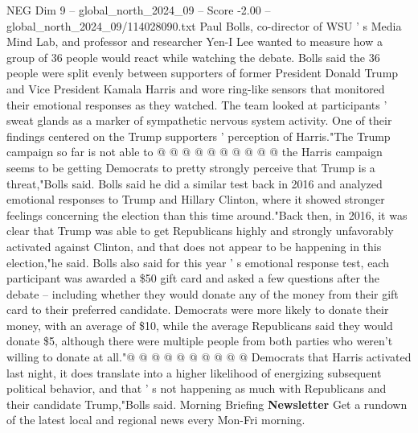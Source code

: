 \begin{textsample}{NEG Dim 9 – global\_north\_2024\_09 – Score -2.00 – global\_north\_2024\_09/114028090.txt}
Paul Bolls, co-director of WSU ' s Media Mind Lab, and professor and researcher Yen-I Lee wanted to measure how a group of 36 people would react while watching the debate.
Bolls said the 36 people were split evenly between supporters of former President Donald Trump and Vice President Kamala Harris and wore ring-like sensors that monitored their emotional responses as they watched.
The team looked at participants ' sweat glands as a marker of sympathetic nervous system activity.
One of their findings centered on the Trump supporters ' perception of Harris."The Trump campaign so far is not able to @ @ @ @ @ @ @ @ @ @ the Harris campaign seems to be getting Democrats to pretty strongly perceive that Trump is a threat,"Bolls said.
Bolls said he did a similar test back in 2016 and analyzed emotional responses to Trump and Hillary Clinton, where it showed stronger feelings concerning the election than this time around."Back then, in 2016, it was clear that Trump was able to get Republicans highly and strongly unfavorably activated against Clinton, and that does not appear to be happening in this election,"he said.
Bolls also said for this year ' s emotional response test, each participant was awarded a \$50 gift card and asked a few questions after the debate -- including whether they would donate any of the money from their gift card to their preferred candidate.
Democrats were more likely to donate their money, with an average of \$10, while the average Republicans said they would donate \$5, although there were multiple people from both parties who weren't willing to donate at all."@ @ @ @ @ @ @ @ @ @ Democrats that Harris activated last night, it does translate into a higher likelihood of energizing subsequent political behavior, and that ' s not happening as much with Republicans and their candidate Trump,"Bolls said.
Morning Briefing \textbf{Newsletter} Get a rundown of the latest local and regional news every Mon-Fri morning.

\end{textsample}
